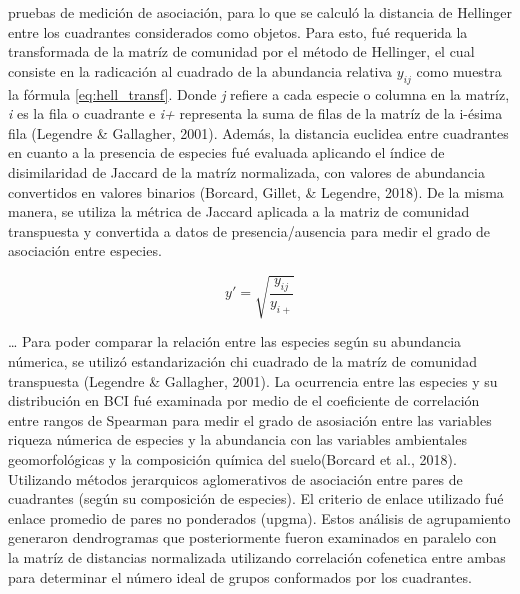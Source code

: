 \documentclass[11pt,]{article}
\begin{document}
pruebas de medición de asociación, para lo que se calculó la distancia
de Hellinger entre los cuadrantes considerados como objetos. Para esto,
fué requerida la transformada de la matríz de comunidad por el método de
Hellinger, el cual consiste en la radicación al cuadrado de la
abundancia relativa \(y_{ij}\) como muestra la fórmula
\ref{eq:hell_transf}. Donde \emph{j} refiere a cada especie o columna en
la matríz, \emph{i} es la fila o cuadrante e \emph{i+} representa la
suma de filas de la matríz de la i-ésima fila (Legendre \& Gallagher,
2001). Además, la distancia euclidea entre cuadrantes en cuanto a la
presencia de especies fué evaluada aplicando el índice de disimilaridad
de Jaccard de la matríz normalizada, con valores de abundancia
convertidos en valores binarios (Borcard, Gillet, \& Legendre, 2018). De
la misma manera, se utiliza la métrica de Jaccard aplicada a la matriz
de comunidad transpuesta y convertida a datos de presencia/ausencia para
medir el grado de asociación entre especies.

\begin{equation} \label{eq:hell_transf}
y' = \sqrt{\frac{y_{ij}}{y_{i+}}}
\end{equation}

\dots
Para poder comparar la relación entre las especies según su abundancia
númerica, se utilizó estandarización chi cuadrado de la matríz de
comunidad transpuesta (Legendre \& Gallagher, 2001). La ocurrencia entre
las especies y su distribución en BCI fué examinada por medio de el
coeficiente de correlación entre rangos de Spearman para medir el grado
de asosiación entre las variables riqueza númerica de especies y la
abundancia con las variables ambientales geomorfológicas y la
composición química del suelo(Borcard et al., 2018). Utilizando métodos
jerarquicos aglomerativos de asociación entre pares de cuadrantes (según
su composición de especies). El criterio de enlace utilizado fué enlace
promedio de pares no ponderados (upgma). Estos análisis de agrupamiento
generaron dendrogramas que posteriormente fueron examinados en paralelo
con la matríz de distancias normalizada utilizando correlación
cofenetica entre ambas para determinar el número ideal de grupos
conformados por los cuadrantes.
\end{document}

